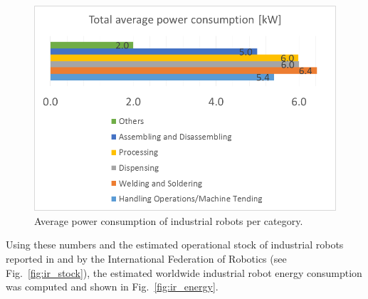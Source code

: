 \begin{appendices}
\begin{figure}[h]
	\centering
	\includegraphics[width=0.95\columnwidth]{fig/industrial_robots_average_power_per_category}
	\caption{Average power consumption of industrial robots per category.}
	\label{fig:ir_average_power}
\end{figure}
Using these numbers and the estimated operational stock of industrial robots reported in \cite{statista_ir_operational_stock} and by the International Federation of Robotics (see Fig.~\ref{fig:ir_stock}), the estimated worldwide industrial robot energy consumption was computed and shown in Fig.~\ref{fig:ir_energy}.

\end{appendices}
